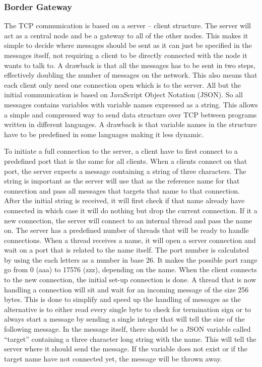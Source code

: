 \subsubsection{Border Gateway} %
\noindent The TCP communication is based on a server – client structure. The server will act as a central node and be a gateway to all of the other nodes. This makes it simple to decide where messages should be sent as it can just be specified in the messages itself, not requiring a client to be directly connected with the node it wants to talk to. A drawback is that all the messages has to be sent in two steps, effectively doubling the number of messages on the network. This also means that each client only need one connection open which is to the server. All but the initial communication is based on JavaScript Object Notation (JSON). So all messages contains variables with variable names expressed as a string. This allows a simple and compressed way to send data structure over TCP between programs written in different languages. A drawback is that variable names in the structure have to be predefined in some languages making it less dynamic. 

\newline \noindent To initiate a full connection to the server, a client have to first connect to a predefined port that is the same for all clients. When a clients connect on that port, the server expects a message containing a string of three characters. The string is important as the server will use that as the reference name for that connection and pass all messages that targets that name to that connection. After the initial string is received, it will first check if that name already have connected in which case it will do nothing but drop the current connection. If it a new connection, the server will connect to an internal thread and pass the name on. The server has a predefined number of threads that will be ready to handle connections. When a thread receives a name, it will open a server connection and wait on a port that is related to the name itself. The port number is calculated by using the each letters as a number in base 26. It makes the possible port range go from 0 (aaa) to 17576 (zzz), depending on the name. When the client connects to the new connection, the initial set-up connection is done. A thread that is now handling a connection will sit and wait for an incoming message of the size 256 bytes. This is done to simplify and speed up the handling of messages as the alternative is to either read every single byte to check for termination sign or to always start a message by sending a single integer that will tell the size of the following message. In the message itself, there should be a JSON variable called “target” containing a three character long string with the name. This will tell the server where it should send the message. If the variable does not exist or if the target name have not connected yet, the message will be thrown away. 

